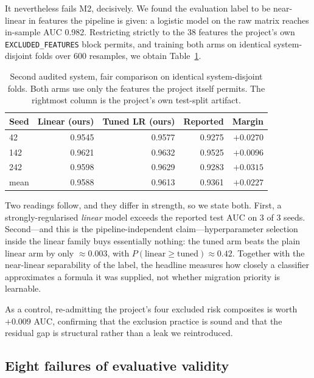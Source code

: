 \documentclass[conference]{IEEEtran}
\newcommand{\code}[1]{\texttt{\small #1}}
\begin{document}
It nevertheless fails M2, decisively. We found the evaluation label to be near-linear in
features the pipeline is given: a logistic model on the raw matrix reaches in-sample AUC
0.982. Restricting strictly to the 38 features the project's own \code{EXCLUDED\_FEATURES}
block permits, and training both arms on identical system-disjoint folds over 600
resamples, we obtain Table~\ref{tab:sys2}.

\begin{table}[t]
\centering
\caption{Second audited system, fair comparison on identical system-disjoint folds.
Both arms use only the features the project itself permits. The rightmost column is the
project's own test-split artifact.}
\label{tab:sys2}
\begin{tabular}{@{}lrrrr@{}}
\toprule
\textbf{Seed} & \textbf{Linear (ours)} & \textbf{Tuned LR (ours)} &
\textbf{Reported} & \textbf{Margin} \\
\midrule
42  & 0.9545 & 0.9577 & 0.9275 & $+0.0270$ \\
142 & 0.9621 & 0.9632 & 0.9525 & $+0.0096$ \\
242 & 0.9598 & 0.9629 & 0.9283 & $+0.0315$ \\
\midrule
mean & 0.9588 & 0.9613 & 0.9361 & $+0.0227$ \\
\bottomrule
\end{tabular}
\end{table}

Two readings follow, and they differ in strength, so we state both. First, a
strongly-regularised \emph{linear} model exceeds the reported test AUC on 3 of 3 seeds.
Second---and this is the pipeline-independent claim---hyperparameter selection inside the
linear family buys essentially nothing: the tuned arm beats the plain linear arm by only
$\approx$0.003, with $P(\text{linear}\geq\text{tuned})\approx0.42$. Together with the
near-linear separability of the label, the headline measures how closely a classifier
approximates a formula it was supplied, not whether migration priority is learnable.

As a control, re-admitting the project's four excluded risk composites is worth $+0.009$
AUC, confirming that the exclusion practice is sound and that the residual gap is
structural rather than a leak we reintroduced.

\subsection{Eight failures of evaluative validity}
\end{document}

